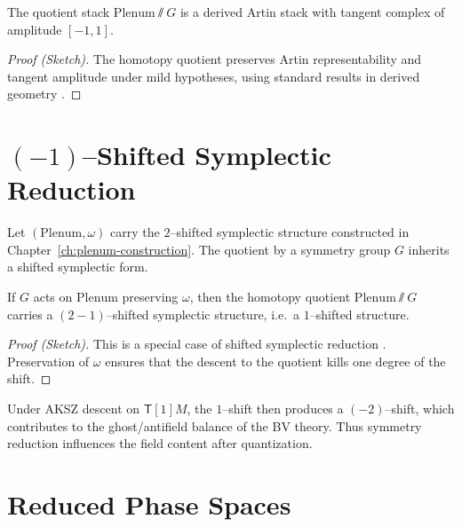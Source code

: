 \begin{proposition}[Properties]
\label{prop:quotient-props}
The quotient stack $\mathrm{Plenum}\sslash G$
is a derived Artin stack with tangent complex of amplitude $[-1,1]$.
\end{proposition}

\begin{proof}[Proof (Sketch)]
The homotopy quotient preserves Artin representability and tangent
amplitude under mild hypotheses, using standard results in derived
geometry \cite{ToenVezzosi-HAGII,Calaque16}.
\end{proof}



\section{$(-1)$--Shifted Symplectic Reduction}
\label{sec:shifted-reduction}

Let $(\mathrm{Plenum},\omega)$ carry the $2$--shifted symplectic
structure constructed in Chapter~\ref{ch:plenum-construction}.
The quotient by a symmetry group $G$ inherits a shifted symplectic form.

\begin{theorem}
\label{thm:shifted-reduction}
If $G$ acts on $\mathrm{Plenum}$ preserving $\omega$, then the
homotopy quotient $\mathrm{Plenum}\sslash G$ carries a
$(2-1)$--shifted symplectic structure, i.e.\ a $1$--shifted structure.
\end{theorem}

\begin{proof}[Proof (Sketch)]
This is a special case of shifted symplectic reduction
\cite{Calaque16}.  Preservation of $\omega$ ensures that
the descent to the quotient kills one degree of the shift.
\end{proof}

\begin{remark}
Under AKSZ descent on $\mathsf{T}[1]M$, the $1$--shift then produces a
$(-2)$--shift, which contributes to the ghost/antifield balance of
the BV theory.  Thus symmetry reduction influences the field content
after quantization.
\end{remark}



\section{Reduced Phase Spaces}
\label{sec:reduced-phase}


